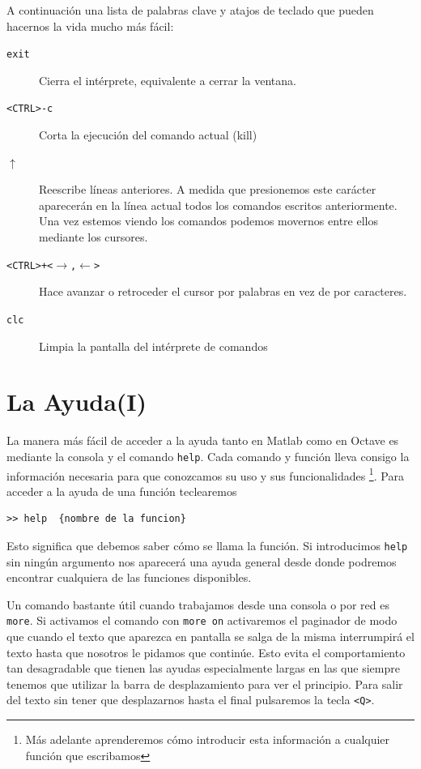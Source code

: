 A continuación una lista de palabras clave y atajos de teclado que
pueden hacernos la vida mucho más fácil:

\begin{description}
\item [\texttt{exit}]Cierra el intérprete, equivalente a cerrar la
  ventana.
\item [\texttt{<CTRL>-c}]Corta la ejecución del comando actual (kill)
\item [$\uparrow$]Reescribe líneas anteriores. A medida que
  presionemos este carácter aparecerán en la línea actual todos los
  comandos escritos anteriormente. Una vez estemos viendo los comandos
  podemos movernos entre ellos mediante los cursores.
\item [\texttt{<CTRL>+<$\rightarrow$,$\leftarrow$>}]Hace avanzar o
  retroceder el cursor por palabras en vez de por caracteres.
\item [\texttt{clc}]Limpia la pantalla del intérprete de comandos
\end{description}

\section{La Ayuda(I)}

La manera más fácil de acceder a la ayuda tanto en Matlab como en
Octave es mediante la consola y el comando \texttt{help}.
Cada comando y función lleva consigo la información necesaria para que
conozcamos su uso y sus funcionalidades%
\footnote{Más adelante aprenderemos cómo introducir esta información a
  cualquier función que escribamos%
}. Para acceder a la ayuda de una función teclearemos

\begin{lstlisting}
>> help  {nombre de la funcion}
\end{lstlisting}

Esto significa que debemos saber cómo se llama la función. Si
introducimos \texttt{help} sin ningún argumento nos aparecerá una
ayuda general desde donde podremos encontrar cualquiera de las
funciones disponibles.

Un comando bastante útil cuando trabajamos desde una consola o por
red es \texttt{more}. Si activamos el comando con
\texttt{more on} activaremos el paginador de modo que cuando el texto
que aparezca en pantalla se salga de la misma interrumpirá el texto
hasta que nosotros le pidamos que continúe. Esto evita el
comportamiento tan desagradable que tienen las ayudas especialmente
largas en las que siempre tenemos que utilizar la barra de
desplazamiento para ver el principio. Para salir del texto sin tener
que desplazarnos hasta el final pulsaremos la tecla \texttt{<Q>}.


